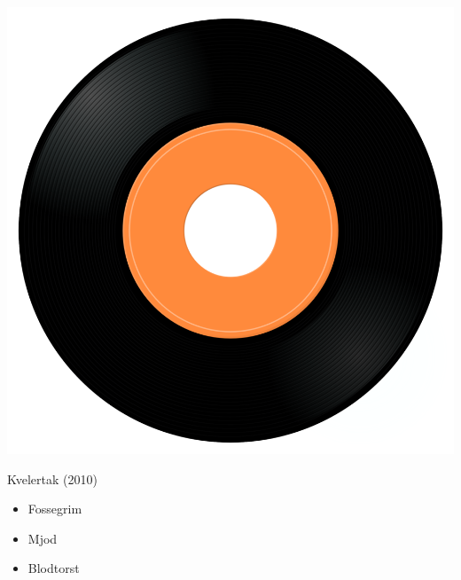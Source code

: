 \begin{minipage}[t]{0.25\textwidth}
\captionsetup{type=figure}
\includegraphics[width=\textwidth]{Images/cover.png}
\caption*{Kvelertak (2010)}
\end{minipage}
\begin{minipage}[t]{0.25\textwidth}\vspace{0pt}
\begin{itemize}[nosep,leftmargin=1em,labelwidth=*,align=left]
	\setlength{\itemsep}{0pt}
	\item Fossegrim
	\item Mjod
	\item Blodtorst
\end{itemize}
\end{minipage}
